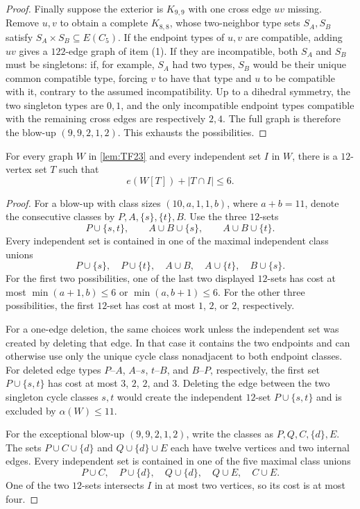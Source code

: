 \begin{proof}
Finally suppose the exterior is $K_{9,9}$ with one cross edge $uv$ missing. Remove $u,v$ to obtain a complete $K_{8,8}$, whose two-neighbor type sets $S_A,S_B$ satisfy $S_A\times S_B\subseteq E(C_5)$. If the endpoint types of $u,v$ are compatible, adding $uv$ gives a $122$-edge graph of item (1). If they are incompatible, both $S_A$ and $S_B$ must be singletons: if, for example, $S_A$ had two types, $S_B$ would be their unique common compatible type, forcing $v$ to have that type and $u$ to be compatible with it, contrary to the assumed incompatibility. Up to a dihedral symmetry, the two singleton types are $0,1$, and the only incompatible endpoint types compatible with the remaining cross edges are respectively $2,4$. The full graph is therefore the blow-up $(9,9,2,1,2)$. This exhausts the possibilities.
\end{proof}

\begin{lemma}
\label{lem:cost12}
For every graph $W$ in \cref{lem:TF23} and every independent set $I$ in $W$, there is a $12$-vertex set $T$ such that
\[
e(W[T])+|T\cap I|\leq6.
\]
\end{lemma}

\begin{proof}
For a blow-up with class sizes $(10,a,1,1,b)$, where $a+b=11$, denote the consecutive classes by $P,A,\{s\},\{t\},B$. Use the three $12$-sets
\[
P\cup\{s,t\},\qquad A\cup B\cup\{s\},\qquad
A\cup B\cup\{t\}.
\]
Every independent set is contained in one of the maximal independent class unions
\[
P\cup\{s\},\quad P\cup\{t\},\quad A\cup B,\quad
A\cup\{t\},\quad B\cup\{s\}.
\]
For the first two possibilities, one of the last two displayed $12$-sets has cost at most $\min(a+1,b)\leq6$ or $\min(a,b+1)\leq6$. For the other three possibilities, the first $12$-set has cost at most $1$, $2$, or $2$, respectively.

For a one-edge deletion, the same choices work unless the independent set was created by deleting that edge. In that case it contains the two endpoints and can otherwise use only the unique cycle class nonadjacent to both endpoint classes. For deleted edge types $P$--$A$, $A$--$s$, $t$--$B$, and $B$--$P$, respectively, the first set $P\cup\{s,t\}$ has cost at most $3$, $2$, $2$, and $3$. Deleting the edge between the two singleton cycle classes $s,t$ would create the independent $12$-set $P\cup\{s,t\}$ and is excluded by $\alpha(W)\leq11$.

For the exceptional blow-up $(9,9,2,1,2)$, write the classes as $P,Q,C,\{d\},E$. The sets $P\cup C\cup\{d\}$ and $Q\cup\{d\}\cup E$ each have twelve vertices and two internal edges. Every independent set is contained in one of the five maximal class unions
\[
P\cup C,\quad P\cup\{d\},\quad Q\cup\{d\},\quad
Q\cup E,\quad C\cup E.
\]
One of the two $12$-sets intersects $I$ in at most two vertices, so its cost is at most four.
\end{proof}

